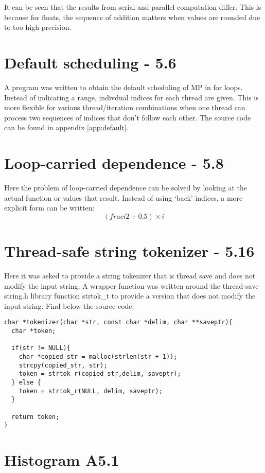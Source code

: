 \documentclass[a4paper,11pt,twoside]{article}
\begin{document}
It can be seen that the results from serial and parallel computation differ. This is because for floats, the sequence of addition matters when values are rounded due to too high precision. 

\section{Default scheduling - 5.6}
A program was written to obtain the default scheduling of MP in for loops. Instead of indicating a range, indivdual indices for each thread are given. This is more flexible for various thread/iteration combinations when one thread can process two sequences of indices that don't follow each other. The source code can be found in appendix \ref{app:default}.  

\section{Loop-carried dependence - 5.8}
Here the problem of loop-carried dependence can be solved by looking at the actual function or values that result. Instead of using `back' indices, a more explicit form can be written:
\begin{equation}
(frac{i}{2} + 0.5)\times i  
\end{equation}

\section{Thread-safe string tokenizer - 5.16}
Here it was asked to provide a string tokenizer that is thread save and does not modify the input string.
A wrapper function was written around the thread-save string.h library function strtok_t to provide a version that does not modify the input string. Find below the source code:
\begin{verbatim}
char *tokenizer(char *str, const char *delim, char **saveptr){
  char *token;

  if(str != NULL){
    char *copied_str = malloc(strlen(str + 1));
    strcpy(copied_str, str);
    token = strtok_r(copied_str,delim, saveptr);
  } else {
    token = strtok_r(NULL, delim, saveptr); 
  }

  return token; 
}
\end{verbatim}

\section{Histogram A5.1}
\end{document}

